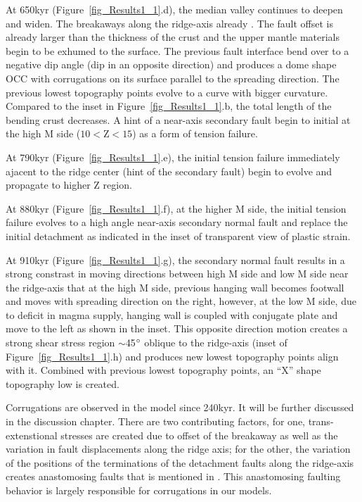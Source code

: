 At 650kyr (Figure~\ref{fig_Results1_1}.d), the median valley continues to deepen and widen. The breakaways along the ridge-axis already . The fault offset is already larger than the thickness of the crust and the upper mantle materials begin to be exhumed to the surface. The previous fault interface bend over to a negative dip angle (dip in an opposite direction) and produces a dome shape OCC with corrugations on its surface parallel to the spreading direction. The previous lowest topography points evolve to a curve with bigger curvature. Compared to the inset in Figure~\ref{fig_Results1_1}.b, the total length of the bending crust decreases. A hint of a near-axis secondary fault begin to initial at the high M side ($10<$Z$<15$) as a form of tension failure. 

At 790kyr (Figure~\ref{fig_Results1_1}.e), the initial tension failure immediately ajacent to the ridge center (hint of the secondary fault) begin to evolve and propagate to higher Z region.  

At 880kyr (Figure~\ref{fig_Results1_1}.f), at the higher M side, the initial tension failure evolves to a high angle near-axis secondary normal fault and replace the initial detachment as indicated in the inset of transparent view of plastic strain.

At 910kyr (Figure~\ref{fig_Results1_1}.g), the secondary normal fault results in a strong constrast in moving directions between high M side and low M side near the ridge-axis that at the high M side, previous hanging wall becomes footwall and moves with spreading direction on the right, however, at the low M side, due to deficit in magma supply, hanging wall is coupled with conjugate plate and move to the left as shown in the inset. This opposite direction motion creates a strong shear stress region $\sim$45$\degree$ oblique to the ridge-axis (inset of Figure~\ref{fig_Results1_1}.h) and produces new lowest topography points align with it. Combined with previous lowest topography points, an ``X'' shape topography low is created.

Corrugations are observed in the model since 240kyr. It will be further discussed in the discussion chapter. There are two contributing factors, for one, trans-extenstional stresses are created due to offset of the breakaway as well as the variation in fault displacements along the ridge axis; for the other, the variation of the positions of the terminations of the detachment faults along the ridge-axis creates anastomosing faults that is mentioned in \citep{Smith2014}. This anastomosing faulting behavior is largely responsible for corrugations in our models.      

